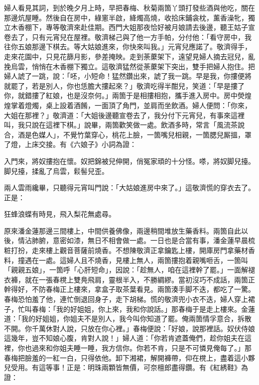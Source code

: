 婦人看見其詞，到於晚夕月上時，早把春梅、秋菊兩箇丫頭打發些酒與他吃，關在那邊炕屋睡。然後自在房中，綠窻半啟，絳燭高燒，收拾床鋪衾枕，薰香澡牝，獨立木香棚下，專等敬濟來赴佳期。西門大姐那夜恰好被月娘請去後邊，聽王姑子宣卷去了，只有元宵兒在屋裡。敬濟梯己與了他一方手帕，分付他：「看守房中，我往你五娘那邊下棋去。等大姑娘進來，你快來叫我。」元宵兒應諾了。敬濟得手，走來花園中，只見花篩月影，參差掩映。走到荼䕷架下，遠望見婦人摘去冠兒，亂挽烏雲，悄悄在木香棚下獨立。這敬濟猛然從荼䕷架下突出，雙手把婦人抱住。把婦人諕了一跳，說：「呸，小短命！猛然鑽出來，諕了我一跳。早是我，你摟便將就罷了，若是別人，你也恁膽大摟起來？」敬濟吃得半酣兒，笑道：「早是摟了你，就錯摟了紅娘，也是沒奈何。」{}兩箇于是相摟相抱，攜手進入房中。房中熒煌煌掌着燈燭，桌上設着酒餚，一面頂了角門，並肩而坐飲酒。婦人便問：「你來，大姐在那裡？」敬濟道：「大姐後邊聽宣卷去了，我分付下元宵兒，有事來這裡叫，我只說在這裡下棋。」說畢，兩箇歡笑做一處。飲酒多時，常言「風流茶說合，酒是色媒人」，不覺竹葉穿心，桃花上臉，一箇嘴兒相親，一箇腮兒厮搵，罩了燈，上床交接。有《六娘子》小詞為證：

\begin{myquote}
入門來，將奴摟抱在懷。奴把錦被兒伸開，俏冤家頑的十分怪。嗏，將奴脚兒擡。脚兒擡，揉亂了烏雲，鬏髻兒歪。
\end{myquote}

兩人雲雨纔畢，只聽得元宵叫門說：「大姑娘進房中來了。」這敬濟慌的穿衣去了。正是：

\begin{myquote}
狂蜂浪蝶有時見，飛入梨花無處尋。
\end{myquote}

原來潘金蓮那邊三間樓上，中間供養佛像，兩邊稍間堆放生藥香料。兩箇自此以後，情沾肺腑，意密如漆，無日不相會做一處。一日也是合當有事，潘金蓮早晨梳粧打扮，走來樓上觀音菩薩前燒香。不想陳敬濟正拿鑰匙上樓，開庫房門拿藥材香料，撞遇在一處。這婦人且不燒香，{}見樓上無人，兩箇摟抱着親嘴咂舌，一箇叫「親親五娘」，一箇呼「心肝短命」，{}因說：「趁無人，咱在這裡幹了罷。」一面解褪衣褲，就在一張春櫈上雙鳧飛肩，靈根半入，不勝綢繆。當初沒巧不成話，兩箇正幹得好，不防春梅正上樓來，拿盒子取茶葉看見。兩箇湊手脚不迭，都吃了一驚。春梅恐怕羞了他，連忙倒退回身子，走下胡梯。慌的敬濟兜小衣不迭，婦人穿上裙子，忙叫春梅：「我的好姐姐，你上來，我和你說話。」那春梅于是走上樓來。金蓮道：「我的好姐姐，你姐夫不是別人，我今叫你知道了罷。俺兩箇情孚意合，拆散不開。你千萬休對人說，只放在你心裡。」春梅便說：「好娘，說那裡話。奴伏侍娘這幾年，豈不知娘心腹，肯對人說！」婦人道：「你若肯遮蓋俺們，趁你姐夫在這裡，你也過來和你姐夫睡一睡，我方信你。你若不肯，只是不可憐見俺每了。」那春梅把臉羞的一紅一白，只得依他。卸下湘裙，解開褲帶，仰在櫈上，盡着這小夥兒受用。{}有這等事！正是：明珠兩顆皆無價，可奈檀郎盡得鑽。有《紅綉鞋》為證：


